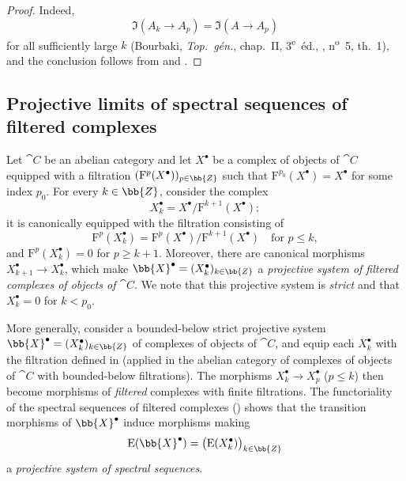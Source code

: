 \begin{proof}
Indeed,
\[
  \Im(A_k\longrightarrow A_p)
  =
  \Im(A\longrightarrow A_p)
\]
for all sufficiently large $k$
(Bourbaki, \emph{Top.\ g\'{e}n.}, chap.~II,
3\textsuperscript{e}~\'{e}d., ,
n\textsuperscript{o}~5, th.~1), and the conclusion follows from
 and .
\end{proof}

\subsection{Projective limits of spectral sequences of filtered complexes}
\label{subsection:0.13.5}

\begin{env}[13.5.1]
\label{0.13.5.1}
Let $\cat{C}$ be an abelian category and let $X^\bullet$ be a complex
of objects of $\cat{C}$ equipped with a filtration
$(\mathrm{F}^p(X^\bullet))_{p\in\bb{Z}}$ such that
$\mathrm{F}^{p_0}(X^\bullet)=X^\bullet$ for some index $p_0$.
For every $k\in\bb{Z}$, consider the complex
\[
  X^\bullet_k=X^\bullet/\mathrm{F}^{k+1}(X^\bullet);
\]
it is canonically equipped with the filtration consisting of
\[
  \mathrm{F}^p(X^\bullet_k)
  =
  \mathrm{F}^p(X^\bullet)/\mathrm{F}^{k+1}(X^\bullet)
  \quad\text{for }p\leq k,
\]
and $\mathrm{F}^p(X^\bullet_k)=0$ for $p\geq k+1$.
Moreover, there are canonical morphisms
$X^\bullet_{k+1}\longrightarrow X^\bullet_k$, which make
$\bb{X}^\bullet=(X^\bullet_k)_{k\in\bb{Z}}$ a \emph{projective system
of filtered complexes of objects of $\cat{C}$}.
We note that this projective system is \emph{strict} and that
$X^\bullet_k=0$ for $k<p_0$.
\end{env}

\begin{env}[13.5.2]
\label{0.13.5.2}
More generally, consider a bounded-below strict projective system
$\bb{X}^\bullet=(X^\bullet_k)_{k\in\bb{Z}}$ of complexes of objects of
$\cat{C}$, and equip each $X^\bullet_k$ with the filtration defined in
 (applied in the abelian category of complexes of
objects of $\cat{C}$ with bounded-below filtrations).
The morphisms
$X^\bullet_k\longrightarrow X^\bullet_p$ ($p\leq k$) then become
morphisms of \emph{filtered} complexes with finite filtrations.
The functoriality of the spectral sequences of filtered complexes
() shows that the transition morphisms of
$\bb{X}^\bullet$ induce morphisms making
\[
  \mathrm{E}(\bb{X}^\bullet)
  =
  \bigl(\mathrm{E}(X^\bullet_k)\bigr)_{k\in\bb{Z}}
\]
a \emph{projective system of spectral sequences}.
\end{env}

